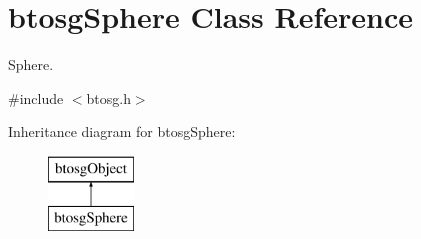 \hypertarget{classbtosgSphere}{}\section{btosg\+Sphere Class Reference}
\label{classbtosgSphere}


Sphere.  




{\ttfamily \#include $<$btosg.\+h$>$}

Inheritance diagram for btosg\+Sphere\+:\begin{figure}[H]
\begin{center}
\leavevmode
\includegraphics[height=2.000000cm]{classbtosgSphere}
\end{center}
\end{figure}
